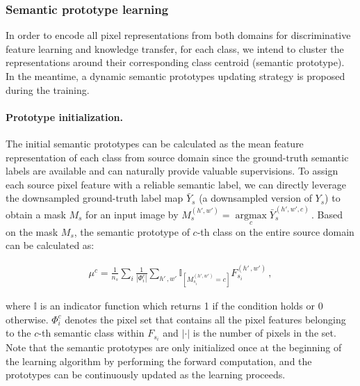 \documentclass[runningheads]{llncs}
\begin{document}
\subsubsection{Semantic prototype learning}
\label{sec:semantic_prototypes}
In order to encode all pixel representations from both domains for discriminative feature learning and knowledge transfer, for each class, we intend to cluster the representations around their corresponding class centroid (semantic prototype). In the meantime, a dynamic semantic prototypes updating strategy is proposed during the training.

\paragraph{Prototype initialization.} The initial semantic prototypes can be calculated as the mean feature representation of each class from source domain since the ground-truth semantic labels are available and can naturally provide valuable supervisions. To assign each source pixel feature with a reliable semantic label, we can directly leverage the downsampled ground-truth label map $\bar{Y}_s$ (a downsampled version of ${Y}_s$) to obtain a mask $M_s$ for an input image by $M_s^{(h',w')} = \mathop{\arg\max}\limits_{c}  \bar{Y}_s^{(h',w',c)}\,.$
Based on the mask $M_s$, the semantic prototype of $c$-th class on the entire source domain can be calculated as:
 \begin{small}
\begin{align}
    \mu^c = \frac{1}{n_s}\sum_i \frac{1}{|\Phi_{i}^c|} \sum_{h'\,, w'} \mathbb{I}_{[M_{s_i}^{(h',w')}=c]} F_{s_i}^{(h'\,, w')}\,,
    \label{eq:semantic_prototype_initialize}
\end{align}
\end{small}where $\mathbb{I}$ is an indicator function which returns 1 if the condition holds or 0 otherwise. $\Phi_{i}^c$ denotes the pixel set that contains all the pixel features belonging to the $c$-th semantic class within $F_{s_i}$ and $|\cdot|$ is the number of pixels in the set. Note that the semantic prototypes are only initialized once at the beginning of the learning algorithm by performing the forward computation, and the prototypes can be continuously updated as the learning proceeds. 
\end{document}
